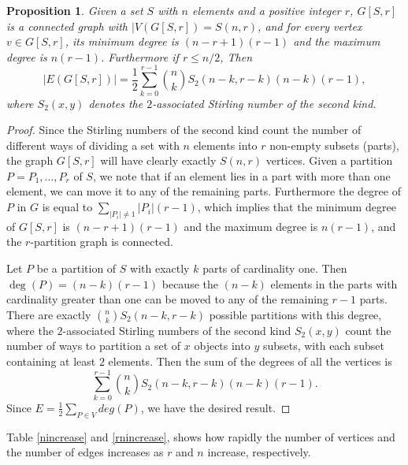 \documentclass[11pt,a4paper]{article}
\theoremstyle{plain}
\newtheorem{proposition}{Proposition}
\theoremstyle{definition}
\begin{document}
\begin{proposition}
Given a set $S$ with $n$ elements and a positive integer $r$,  $G[S, r]$ is a connected graph with $|V(G[S, r])=S(n,r)$, and for every vertex $v\in G[S, r]$, its minimum degree is $(n-r+1)(r-1)$ and the maximum degree is $n(r-1)$. Furthermore  if $r\leq n/2$,  Then \[\vert E(G[S,r])\vert= \frac{1}{2}\sum\limits_{k=0}^{r-1} {n\choose k}S_2(n-k,r-k)(n-k)(r-1),\] where $S_2(x,y)$ denotes the $2$-associated Stirling number of the second kind.
\end{proposition}

\begin{proof}

Since the Stirling numbers of the second kind count the number of different ways of dividing a set with $n$ elements into $r$ non-empty subsets (parts), the graph $G[S, r]$ will have clearly exactly $S(n,r)$ vertices. Given a partition $P= P_1,\dots ,P_r $ of $S$, we note that if an element lies in a part with more than one element, we can move it to any of the remaining parts. Furthermore the degree of $P$ in $G$ is equal to $\sum_{\vert P_i \vert \neq 1} \vert P_i \vert(r-1)$, which implies that the minimum degree of $G[S,r]$ is $(n-r+1)(r-1)$ and the maximum degree is $n(r-1)$, and the $r$-partition graph is connected.

Let $P$ be a partition of $S$ with exactly $k$ parts of cardinality one. Then $\deg(P)=(n-k)(r-1)$ because the $(n-k)$ elements in the parts with cardinality greater than one can be moved to any of the remaining $r-1$ parts. There are exactly ${n \choose k} S_2(n-k,r-k)$ possible partitions with this degree, where the $2$-associated Stirling numbers of the second kind $S_2(x,y)$ count the number of ways to partition a set of $x$ objects into $y$ subsets, with each subset containing at least $2$ elements. Then the sum of the degrees of all the vertices is \[\sum\limits_{k=0}^{r-1}{n \choose k} S_2(n-k,r-k)(n-k)(r-1).\]
Since $E=\frac{1}{2}\sum\limits_{P \in V} deg(P)$, we have the desired result. 
\end{proof}

Table \ref{nincrease} and \ref{rnincrease}, shows how rapidly the number of vertices and the number of edges increases as $r$ and $n$ increase, respectively. 
 
\end{document}

